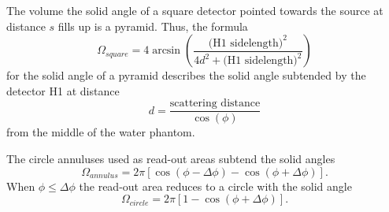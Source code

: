 The volume the solid angle of a square detector pointed towards the source at distance $s$ fills up is a pyramid. Thus, the formula \begin{equation}\Omega_{square} = 4 \arcsin(\frac{\text{(H1 sidelength)}^2}{4d^2+\text{(H1 sidelength)}^2})\end{equation}for the solid angle of a pyramid describes the solid angle subtended by the detector H1 at distance \begin{equation}d = \frac{\text{scattering distance}}{\cos(\phi)}\end{equation}from the middle of the water phantom.

The circle annuluses used as read-out areas subtend the solid angles \begin{equation}\Omega_{annulus} = 2 \pi [\cos(\phi - \Delta\phi) - \cos(\phi + \Delta\phi)].\end{equation}When $\phi \le \Delta\phi$ the read-out area reduces to a circle with the solid angle \begin{equation}\Omega_{circle} = 2 \pi [1 - \cos(\phi + \Delta\phi)].\end{equation}



